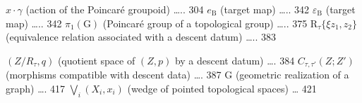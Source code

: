 \(x \cdot \gamma\) (action of the Poincaré groupoid) \ldots.. 304 \(e_{\mathrm{B}}\) (target map) \ldots.. 342 \(\varepsilon_{\mathrm{B}}\) (target map) \ldots.. 342 \(\pi_{1}(\mathrm{G})\) (Poincaré group of a topological group) \ldots.. 375 \(\mathrm{R}_{\tau} \{\xi z_{1}, z_{2}\}\) (equivalence relation associated with a descent datum) \ldots.. 383

\((Z/R_{\tau},q)\) (quotient space of \((Z,p)\) by a descent datum) \ldots. 384 \(C_{\tau,\tau'}(Z;Z')\) (morphisms compatible with descent data) \ldots. 387 \textbar G\textbar{} (geometric realization of a graph) \ldots. 417 \(\bigvee_{i}(X_{i},x_{i})\) (wedge of pointed topological spaces) \ldots{} 421

